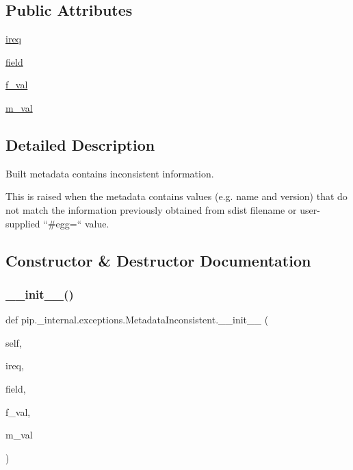 \subsection*{Public Attributes}
\begin{DoxyCompactItemize}
\item 
\hyperlink{classpip_1_1__internal_1_1exceptions_1_1MetadataInconsistent_af469d5c9de7bc37861a96cf4c014d85a}{ireq}
\item 
\hyperlink{classpip_1_1__internal_1_1exceptions_1_1MetadataInconsistent_a7020775c57fdef509df4f7459df10e07}{field}
\item 
\hyperlink{classpip_1_1__internal_1_1exceptions_1_1MetadataInconsistent_ad3e2f24752840d445010d1a0ee964dbf}{f\+\_\+val}
\item 
\hyperlink{classpip_1_1__internal_1_1exceptions_1_1MetadataInconsistent_a486ebaaf88767df460bba1576cd8244b}{m\+\_\+val}
\end{DoxyCompactItemize}


\subsection{Detailed Description}
\begin{DoxyVerb}Built metadata contains inconsistent information.

This is raised when the metadata contains values (e.g. name and version)
that do not match the information previously obtained from sdist filename
or user-supplied ``#egg=`` value.
\end{DoxyVerb}
 

\subsection{Constructor \& Destructor Documentation}
\mbox{\label{classpip_1_1__internal_1_1exceptions_1_1MetadataInconsistent_a2c6e869cf784c9f655f8ac205abe0f3f}} 
\subsubsection{\texorpdfstring{\+\_\+\+\_\+init\+\_\+\+\_\+()}{\_\_init\_\_()}}
{\footnotesize\ttfamily def pip.\+\_\+internal.\+exceptions.\+Metadata\+Inconsistent.\+\_\+\+\_\+init\+\_\+\+\_\+ (\begin{DoxyParamCaption}\item[{}]{self,  }\item[{}]{ireq,  }\item[{}]{field,  }\item[{}]{f\+\_\+val,  }\item[{}]{m\+\_\+val }\end{DoxyParamCaption})}



